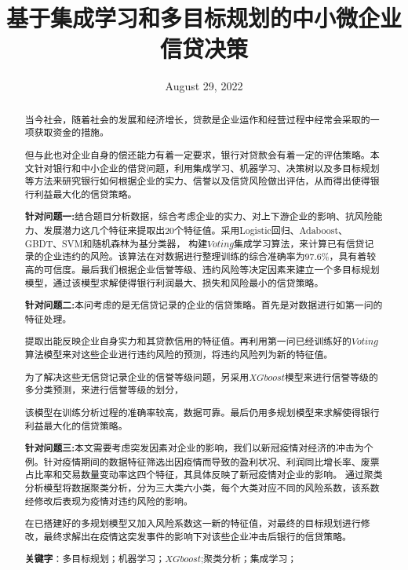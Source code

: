 \documentclass[UTF8]{ctexart}
\title{基于集成学习和多目标规划的中小微企业信贷决策}
\date{August 29, 2022}
\begin{document}
\maketitle{}
\renewcommand{\abstractname}{\Large 摘要\\}
\begin{abstract}
	\normalsize
	当今社会，随着社会的发展和经济增长，贷款是企业运作和经营过程中经常会采取的一项获取资金的措施。

	但与此也对企业自身的偿还能力有着一定要求，银行对贷款会有着一定的评估策略。本文针对银行和中小企业的借贷问题，利用集成学习、机器学习、决策树以及多目标规划等方法来研究银行如何根据企业的实力、信誉以及信贷风险做出评估，从而得出使得银行利益最大化的信贷策略。

	\textbf{针对问题一:}结合题目分析数据，综合考虑企业的实力、对上下游企业的影响、抗风险能力、发展潜力这几个特征来提取出20个特征值。采用Logistic回归、Adaboost、GBDT、SVM和随机森林为基分类器，	构建$Voting$集成学习算法，来计算已有信贷记录的企业违约的风险。该算法在对数据进行整理训练的综合准确率为97.6$\%$，具有着较高的可信度。最后我们根据企业信誉等级、违约风险等决定因素来建立一个多目标规划模型，通过该模型求解使得银行利润最大、损失和风险最小的信贷策略。

	\textbf{针对问题二:}本问考虑的是无信贷记录的企业的信贷策略。首先是对数据进行如第一问的特征处理。

	提取出能反映企业自身实力和其贷款信用的特征值。再利用第一问已经训练好的$Voting$算法模型来对这些企业进行违约风险的预测，将违约风险列为新的特征值。

	为了解决这些无信贷记录企业的信誉等级问题，另采用$XGboost$模型来进行信誉等级的多分类预测，来进行信誉等级的划分，

	该模型在训练分析过程的准确率较高，数据可靠。最后仍用多规划模型来求解使得银行利益最大化的信贷策略。

	\textbf{针对问题三:}本文需要考虑突发因素对企业的影响，我们以新冠疫情对经济的冲击为个例。针对疫情期间的数据特征筛选出因疫情而导致的盈利状况、利润同比增长率、废票占比率和交易数量变动率这四个特征，其具体反映了新冠疫情对企业的影响。
	通过聚类分析模型将数据聚类分析，分为三大类六小类，每个大类对应不同的风险系数，该系数经修改后表现为疫情对违约风险的影响。

	在已搭建好的多规划模型又加入风险系数这一新的特征值，对最终的目标规划进行修改，最终求解出在疫情这突发事件的影响下对该些企业冲击后银行的信贷策略。

	\vspace{5em}
	\textbf{关键字}：多目标规划；机器学习；$XGboost$;聚类分析；集成学习；

\end{abstract}
\end{document}
